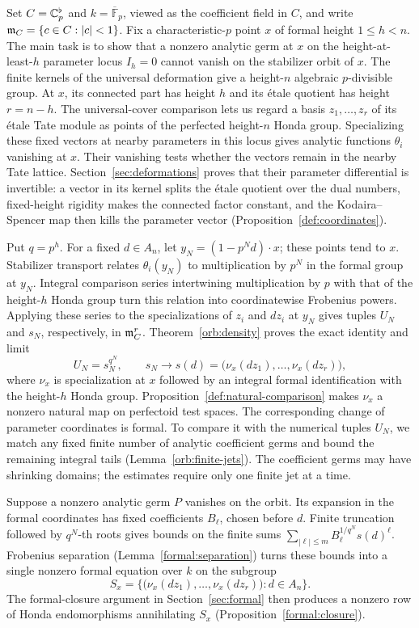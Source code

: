 Set \(C=\mathbb C_p^\flat\) and \(k=\overline{\mathbb F}_p\), viewed as the
coefficient field in \(C\), and write
\(\mathfrak m_C=\{c\in C:|c|<1\}\).  Fix a characteristic-\(p\) point \(x\)
of formal height \(1\leq h<n\).  The main task is to show that a
nonzero analytic germ at \(x\) on the height-at-least-\(h\) parameter locus
\(I_h=0\) cannot vanish on the stabilizer orbit of \(x\).
The finite kernels of the universal deformation give a height-\(n\)
algebraic \(p\)-divisible group.  At \(x\), its connected part has
height \(h\) and its \'{e}tale quotient has height \(r=n-h\).
The universal-cover comparison lets us regard a basis
\(z_1,\ldots,z_r\) of its \'{e}tale Tate module as points of the
perfected height-\(n\) Honda group.  Specializing these fixed vectors
at nearby parameters in this locus gives analytic functions \(\theta_i\) vanishing
at \(x\).  Their vanishing tests whether the vectors remain in the
nearby Tate lattice.  Section~\ref{sec:deformations} proves that their
parameter differential is invertible: a vector in its kernel splits
the \'{e}tale quotient over the dual numbers, fixed-height rigidity
makes the connected factor constant, and the Kodaira--Spencer map
then kills the parameter vector
(Proposition~\ref{def:coordinates}).

Put \(q=p^h\).  For a fixed \(d\in A_n\), let
\(y_N=(1-p^Nd)\cdot x\); these points tend to \(x\).
Stabilizer transport relates \(\theta_i(y_N)\) to multiplication by
\(p^N\) in the formal group at \(y_N\).  Integral comparison series
intertwining multiplication by \(p\) with that of the height-\(h\)
Honda group turn this relation into coordinatewise Frobenius powers.
Applying these series to the specializations of \(z_i\) and
\(dz_i\) at \(y_N\) gives tuples \(U_N\) and \(s_N\), respectively,
in \(\mathfrak m_C^r\).  Theorem~\ref{orb:density} proves the exact identity
and limit
\[
 U_N=s_N^{q^N},\qquad
 s_N\longrightarrow s(d)=\bigl(\nu_x(dz_1),\ldots,\nu_x(dz_r)\bigr),
\]
where \(\nu_x\) is specialization at \(x\) followed by an integral
formal identification with the height-\(h\) Honda group.
Proposition~\ref{def:natural-comparison} makes \(\nu_x\) a nonzero
natural map on perfectoid test spaces.  The corresponding change of
parameter coordinates is formal.  To compare it with the numerical
tuples \(U_N\), we match any fixed finite number of analytic
coefficient germs and bound the remaining integral tails
(Lemma~\ref{orb:finite-jets}).  The coefficient germs may have
shrinking domains; the estimates require only one finite jet at a time.

Suppose a nonzero analytic germ \(P\) vanishes on the orbit.  Its expansion
in the formal coordinates has fixed coefficients \(B_\ell\), chosen
before \(d\).  Finite truncation followed by \(q^N\)-th roots gives
bounds on the finite sums
\(\sum_{|\ell|\leq m} B_\ell^{1/q^N}s(d)^\ell\).
Frobenius separation (Lemma~\ref{formal:separation}) turns these
bounds into a single nonzero formal equation over \(k\) on the subgroup
\[
 S_x=\{\bigl(\nu_x(dz_1),\ldots,\nu_x(dz_r)\bigr):d\in A_n\}.
\]
The formal-closure argument in Section~\ref{sec:formal} then produces
a nonzero row of Honda endomorphisms annihilating \(S_x\)
(Proposition~\ref{formal:closure}).

